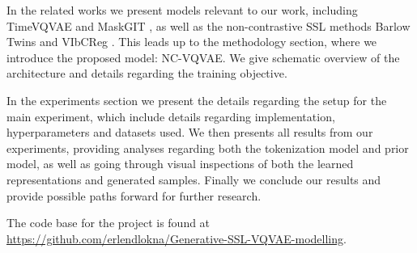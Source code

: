 \documentclass[../../thesis.tex]{subfiles}
\begin{document}
In the related works we present models relevant to our work, including TimeVQVAE \cite{TimeVQVAE} and MaskGIT \cite{chang2022maskgit}, as well as the non-contrastive SSL methods Barlow Twins \cite{zbontar2021barlow} and VIbCReg \cite{lee2024computer}. This leads up to the methodology section, where we introduce the proposed model: NC-VQVAE. We give schematic overview of the architecture and details regarding the training objective.\newline

In the experiments section we present the details regarding the setup for the main experiment, which include details regarding implementation, hyperparameters and datasets used. We then presents all results from our experiments, providing analyses regarding both the tokenization model and prior model, as well as going through visual inspections of both the learned representations and generated samples. Finally we conclude our results and provide possible paths forward for further research. \newline

The code base for the project is found at \url{https://github.com/erlendlokna/Generative-SSL-VQVAE-modelling}.
\end{document}
